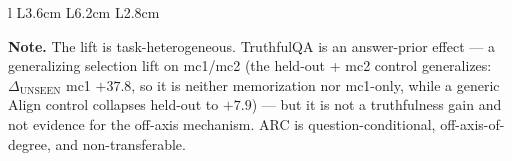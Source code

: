 \begin{table}[tbp]
\begin{threeparttable}
\begin{tabular}{l L{3.6cm} L{6.2cm} L{2.8cm}}
\bottomrule
\end{tabular}
\begin{tablenotes}[flushleft]\footnotesize
\item \textbf{Note.} The lift is task-heterogeneous. TruthfulQA is an answer-prior
effect --- a generalizing selection lift on mc1/mc2 (the held-out + mc2 control
generalizes: $\Delta_{\mathrm{UNSEEN}}$ mc1 $+37.8$, so it is neither memorization
nor mc1-only, while a generic Align control collapses held-out to $+7.9$) --- but
it is not a truthfulness gain and not evidence for the off-axis mechanism. ARC is
question-conditional, off-axis-of-degree, and non-transferable.
\end{tablenotes}
\end{threeparttable}
\end{table}


